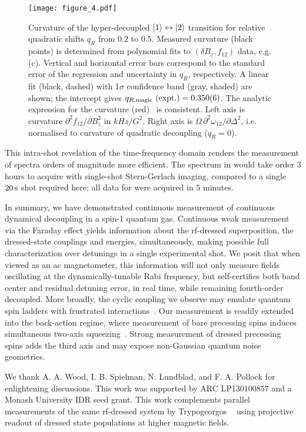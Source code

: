 \documentclass[aps,prl,reprint,superscriptaddress,floatfix]{revtex4-1}
\begin{document}
\begin{figure}
    \texttt{[image: figure\_4.pdf]}
    \caption{
    \label{fig:curvature_vs_qR}
        Curvature of the hyper-decoupled $\vert 1 \rangle  \leftrightarrow \vert 2 \rangle $ transition for relative quadratic shifts $q_R$ from $0.2$ to $0.5$.
        Measured curvature (black points) is determined from polynomial fits to $(\delta B_z, f_{12})$ data, e.g. (c).
        Vertical and horizontal error bars correspond to the standard error of the regression and uncertainty in $q_R$, respectively.
        A linear fit (black, dashed) with 1$\sigma$ confidence band (gray, shaded) are shown; the intercept gives $q_{R,\text{magic}}\text{ (expt.)} = 0.350(6)$.
        The analytic expression for the curvature (red)~\cite{Note1} is consistent.
        Left axis is curvature $\partial^2 f_{12}/\partial B_z^2$ in  $\unit{kHz/G^2}$.
        Right axis is $\Omega\, \partial^2\omega_{12}/\partial \Delta^2$, i.e. normalised to curvature of quadratic decoupling ($q_R=0$).
    }
\end{figure}

This intra-shot revelation of the time-frequency domain renders the measurement of spectra orders of magnitude more efficient.
The spectrum in  would take order 3 hours to acquire with single-shot Stern-Gerlach imaging, compared to a single $\unit[20]{s}$ shot required here; all data for  were acquired in $5$ minutes.

In summary, we have demonstrated continuous measurement of continuous dynamical decoupling in a spin-1 quantum gas.
Continuous weak measurement via the Faraday effect yields information about the rf-dressed superposition, the dressed-state couplings and energies, simultaneously, making possible full characterization over detunings in a single experimental shot.
We posit that when viewed as an ac magnetometer, this information will not only measure fields oscillating at the dynamically-tunable Rabi frequency, but self-certifies both band center and residual detuning error, in real time, while remaining fourth-order decoupled.
More broadly, the cyclic coupling we observe may emulate quantum spin ladders with frustrated interactions~\cite{mikeska_one-dimensional_2004}.
Our measurement is readily extended into the back-action regime, where
measurement of bare precessing spins induces simultaneous two-axis squeezing~\cite{colangelo_simultaneous_2017}.
Strong measurement of dressed precessing spins adds the third axis and may expose non-Gaussian quantum noise geometries.

We thank A. A. Wood, I. B. Spielman, N. Lundblad, and F. A. Pollock for enlightening discussions.
This work was supported by ARC LP130100857 and a Monash University IDR seed grant. 
This work complements parallel measurements of the same rf-dressed system by Trypogeorgos \etal~\cite{trypogeorgos_synthetic_2017} using projective readout of dressed state populations at higher magnetic fields.


\end{document}
